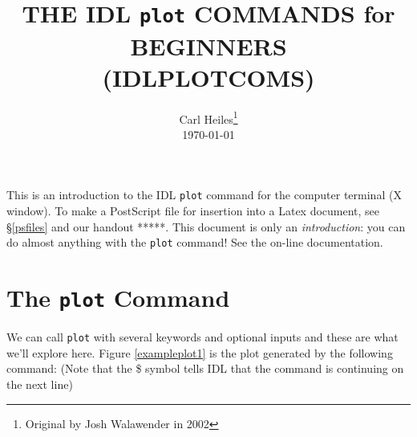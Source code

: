 \documentclass[preprint]{aastex}
\begin{document}
\newcommand{\plot}{\verb&plot& }
\newcommand{\oplot}{\verb&oplot& }
\newcommand{\oploterr}{\verb&oploterr& }
\newcommand{\setplot}{\verb&set\_plot& }
\newcommand{\device}{\verb&device& }
\newcommand{\startplot}{\verb&startplot& }
\newcommand{\eplot}{\verb&endplot& }
\newcommand{\xyouts}{\verb&xyouts& }
\newcommand{\lab}{\verb&label& }
\newcommand{\refer}{\verb&ref& }
\newcommand{\openplotps}{\verb&openplotps& }
\newcommand{\closeplotps}{\verb&closeplotps& }

\setlength{\parskip}{.02in}



\title{THE IDL {\tt plot} COMMANDS for BEGINNERS \\ (IDLPLOTCOMS)}

\author{Carl Heiles\footnote{Original by Josh Walawender in 2002} \\ \today} 

This is an introduction to the IDL {\tt plot} command for the computer
terminal (X window). To make a PostScript file for insertion into a
Latex document, see \S \ref{psfiles} and our handout *****. This
document is only an {\it introduction}: you can do almost anything with
the {\tt plot} command! See the on-line documentation.

\section{The {\tt plot} Command}

We can call {\tt plot} with several keywords and optional inputs and
these are what we'll explore here.  Figure \ref{exampleplot1} is the
plot generated by the following command: (Note that the \$ symbol tells
IDL that the command is continuing on the next line)
\end{document}
